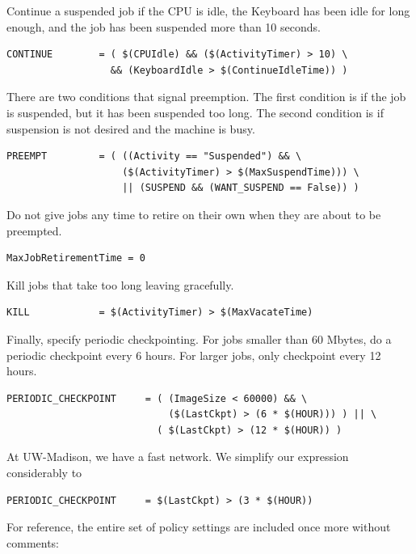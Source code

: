 Continue a suspended job if the CPU is idle, the Keyboard has been
idle for long enough, and the job has been suspended more
than 10 seconds.
\begin{verbatim}
CONTINUE        = ( $(CPUIdle) && ($(ActivityTimer) > 10) \
                  && (KeyboardIdle > $(ContinueIdleTime)) )
\end{verbatim}

There are two conditions that signal preemption.
The first condition is if the job is suspended,
but it has been suspended too long.
The second condition is if suspension is not desired and the machine is busy. 
\begin{verbatim}
PREEMPT	        = ( ((Activity == "Suspended") && \
                    ($(ActivityTimer) > $(MaxSuspendTime))) \
                    || (SUSPEND && (WANT_SUSPEND == False)) )
\end{verbatim}


Do not give jobs any time to retire on their own when they are about to
be preempted.

\begin{verbatim}
MaxJobRetirementTime = 0
\end{verbatim}


Kill jobs that take too long leaving gracefully.
\begin{verbatim}
KILL            = $(ActivityTimer) > $(MaxVacateTime)
\end{verbatim}

Finally, specify periodic checkpointing.  
For jobs smaller than 60 Mbytes, do a periodic checkpoint every 6 hours.  
For larger jobs, only checkpoint every 12 hours.
\begin{verbatim}
PERIODIC_CHECKPOINT     = ( (ImageSize < 60000) && \
                            ($(LastCkpt) > (6 * $(HOUR))) ) || \ 
                          ( $(LastCkpt) > (12 * $(HOUR)) )
\end{verbatim}

\index{policy!at UW-Madison}

At UW-Madison, we have a fast network.
We simplify our expression considerably to
\begin{verbatim}
PERIODIC_CHECKPOINT     = $(LastCkpt) > (3 * $(HOUR))
\end{verbatim}

For reference, the entire set of policy settings are included
once more without comments:

